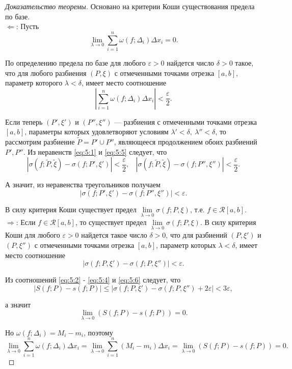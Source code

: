 \documentclass[12pt]{report}
\numberwithin{equation}{section}
\begin{document}
\begin{proof}[Доказательство теоремы] Основано на критерии Коши существования предела по базе.\\

$\Leftarrow$: Пусть
\[ \lim_{\lambda \to 0} \sum_{i=1}^n \omega(f; \Delta_i) \Delta x_i = 0.\]

По определению предела по базе для любого $\varepsilon > 0$ найдется число $\delta > 0$ такое, что для любого разбиения $(P, \xi)$ с отмеченными точками отрезка $[a,b]$, параметр которого $\lambda < \delta$, имеет место соотношение
\begin{equation} \label{eq:5:5}
\left| \sum_{i=1}^n \omega(f; \Delta_i) \Delta x_i\right| < \frac{\varepsilon}{2}.
\end{equation}

Если теперь $(P', \xi')$ и $(P'', \xi'')$  --- разбиения с отмеченными точками отрезка $[a,b]$, параметры которых удовлетворяют условиям $\lambda' < \delta,~ \lambda'' < \delta$, то рассмотрим разбиение $\tilde{P} = P' \cup P''$, являющееся продолжением обоих разбиений $P', P''$. Из неравенств \eqref{eq:5:1} и \eqref{eq:5:5} следует, что
\[ \left|\sigma(f; \tilde{P}, \tilde{\xi}) - \sigma(f; P', \xi') \right| < \frac{\varepsilon}{2}, ~~~~ \left|\sigma(f; \tilde{P}, \tilde{\xi}) - \sigma(f; P'', \xi'')\right| < \frac{\varepsilon}{2}. \]

А значит, из неравенства треугольников получаем
\[ \left| \sigma(f; P', \xi') - \sigma(f; P'', \xi'')\right| < \varepsilon.\]

В силу критерия Коши существует предел $\lim\limits_{\lambda \to 0} \sigma(f; P, \xi)$, т.е. $f \in \mathcal{R}[a,b]$.\\

$\Rightarrow$: Если  $f \in \mathcal{R}[a,b]$, то существует предел  $\lim\limits_{\lambda \to 0} \sigma(f; P, \xi)$. В силу критерия Коши для любого $\varepsilon > 0$ найдется такое число $\delta > 0$, что для разбиений $(P, \xi')$ и $(P, \xi'')$ с отмеченными точками отрезка $[a,b]$, параметр которых $\lambda < \delta$, имеет место соотношение
\begin{equation} \label{eq:5:6}
\left| \sigma(f;P, \xi') - \sigma(f;P, \xi'')\right| < \varepsilon.
\end{equation}


Из соотношений \eqref{eq:5:2} - \eqref{eq:5:4} и \eqref{eq:5:6} следует, что
\[ \left| S(f;P) - s(f;P)\right| \leqslant | \sigma(f;P, \xi') - \sigma(f; P, \xi'') + 2 \varepsilon | < 3 \varepsilon,\]

а значит
\[ \lim_{\lambda \to 0} \left( S(f;P) - s(f;P)\right) = 0.\]

Но $\omega(f;\Delta_i) = M_i - m_i$, поэтому
\[ \lim_{\lambda \to 0} \sum_{i = 1}^n \omega(f; \Delta_i) \Delta x_i =  \lim_{\lambda \to 0} \sum_{i = 1}^n (M_i - m_i) \Delta x_i =\lim_{\lambda \to 0} \left( S(f;P) - s(f;P)\right) = 0.\]
\end{proof}
\end{document}
